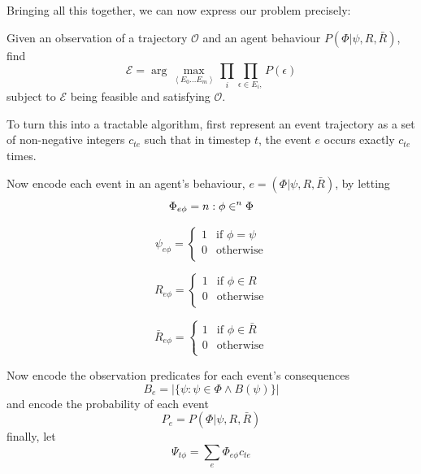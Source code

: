 \documentclass{article}
\begin{document}
Bringing all this together, we can now express our problem precisely:

Given an observation of a trajectory $\mathcal{O}$ and an agent behaviour $P(\Phi|\psi,R,\bar{R})$, find
\begin{equation}
\mathcal{E} = \arg\max_{\left<E_0...E_m\right>}\prod_{i}\prod_{\epsilon\in E_i, }P(\epsilon)
\end{equation}
subject to $\mathcal{E}$ being feasible and satisfying $\mathcal{O}$.

To turn this into a tractable algorithm, first represent an event trajectory as a set of non-negative integers $c_{te}$ such that in timestep $t$, the event $e$ occurs exactly $c_{te}$ times.

Now encode each event in an agent's behaviour, $e = (\Phi|\psi,R,\bar{R})$, by letting 
\begin{equation}
\Phi_{e\phi} = n: \phi \in^n \Phi\\
\end{equation}

\begin{equation}
\psi_{e\phi} = 
\begin{cases}
1&\text{if } \phi = \psi\\
0&\text{otherwise}\\
\end{cases}
\end{equation}

\begin{equation}
R_{e\phi} =
\begin{cases}
1&\text{if } \phi \in R\\
0&\text{otherwise}\\
\end{cases}
\end{equation}

\begin{equation}
\bar{R}_{e\phi} =
\begin{cases}
1&\text{if } \phi \in \bar{R}\\
0&\text{otherwise}\\
\end{cases}
\end{equation}

Now encode the observation predicates for each event's consequences
\begin{equation}
B_e = |\{\psi: \psi\in\Phi \wedge B(\psi)\}|
\end{equation}
and encode the probability of each event
\[
P_e = P(\Phi|\psi,R,\bar{R})
\]
finally, let
\begin{equation}
\Psi_{t\phi} = \sum_e\Phi_{e\phi}c_{te}
\label{stateIndicator}
\end{equation}
\end{document}
